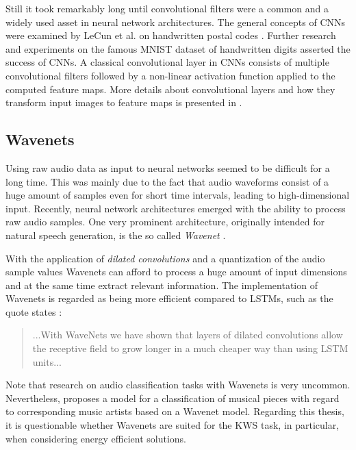 Still it took remarkably long until convolutional filters were a common and a widely used asset in neural network architectures.
The general concepts of CNNs were examined by LeCun et al. on handwritten postal codes \cite{LeCun1989_Generalization}.
Further research and experiments on the famous MNIST dataset of handwritten digits \cite{LeCun1998} asserted the success of CNNs.
A classical convolutional layer in CNNs consists of multiple convolutional filters followed by a non-linear activation function applied to the computed feature maps.
More details about convolutional layers and how they transform input images to feature maps is presented in .



\subsection{Wavenets}\label{sec:prev_nn_wavenet}
Using raw audio data as input to neural networks seemed to be difficult for a long time.
This was mainly due to the fact that audio waveforms consist of a huge amount of samples even for short time intervals, leading to high-dimensional input.
Recently, neural network architectures emerged with the ability to process raw audio samples.
One very prominent architecture, originally intended for natural speech generation, is the so called \emph{Wavenet} \cite{Oord2016}.

With the application of \emph{dilated convolutions} and a quantization of the audio sample values Wavenets can afford to process a huge amount of input dimensions and at the same time extract relevant information.
The implementation of Wavenets is regarded as being more efficient compared to LSTMs, such as the quote states \cite{Oord2016}:
\begin{quote}
  ...With WaveNets we have shown that layers of dilated convolutions allow the receptive field to grow longer in a much cheaper way than using LSTM units...
\end{quote}
Note that research on audio classification tasks with Wavenets is very uncommon.
Nevertheless, \cite{Zhang2020} proposes a model for a classification of musical pieces with regard to corresponding music artists based on a Wavenet model.
Regarding this thesis, it is questionable whether Wavenets are suited for the KWS task, in particular, when considering energy efficient solutions.



